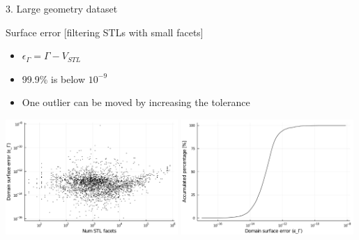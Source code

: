 \documentclass{beamer}
\begin{document}
\begin{frame}{3. Large geometry dataset}

  \begin{block}{Surface error [filtering STLs with small facets]}
  \begin{itemize}
    \item
      $\epsilon_\Gamma = \Gamma - V_{STL}$
    \item
      99.9\% is below $10^{-9}$
    \item
      One outlier can be moved by increasing the tolerance
  \end{itemize}
  \end{block}

  \includegraphics[width=0.49\textwidth]{../analysis/plots/filter_num_stl_facets_surface_error}
  \includegraphics[width=0.49\textwidth]{../analysis/plots/filter_histogram_surface_error}
\end{frame}
\end{document}
